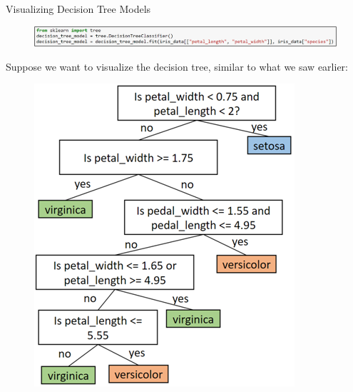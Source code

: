\documentclass[aspectratio=169]{../latex_main/tntbeamer}  %
\begin{document}
	
	\begin{frame}{Visualizing Decision Tree Models }
	    \begin{figure}
	        \centering
	        \includegraphics[scale=.6]{Bild17}
	    \end{figure}
	    Suppose we want to visualize the decision tree, similar to what we saw earlier:
        \begin{figure}
            \centering
            \includegraphics[scale=.65]{Bild19}
        \end{figure}
	\end{frame}
	
\end{document}
